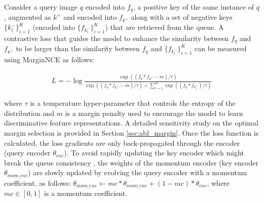 \documentclass[10pt,twocolumn,letterpaper]{ieeeconf}
\begin{document}
Consider a query image $q$ encoded into $f_q$, a positive key of the same instance of $q$, augmented as $k^+$ and encoded into $f_{k^+}$ along with a set of negative keys $\{k^-_i\}^K_{i=1}$ (encoded into $\{f_{k^-_i}\}^K_{i=1}$) that are retrieved from the queue. A contrastive loss that guides the model to enhance the similarity between $f_q$ and $f_{k^+}$ to be larger than the similarity between $f_q$ and $\{f_{k^-_i}\}^K_{i=1}$ can be measured using MarginNCE \cite{MarginNCE} as follows:
\begin{footnotesize}
\begin{align}
    L = - \log\frac{\exp\left((f_q*f_{k^+} - m) / \tau \right)} {\exp\left((f_q*f_{k^+} - m) / \tau \right) + \sum_{i=1}^{K}\exp\left((f_q*f_{k^-_i} ) / \tau\right)}
    \label{eq:MarginNCE}
\end{align}
\end{footnotesize}
where $\tau$ is a temperature hyper-parameter that controls the entropy of the distribution \cite{KD_temperature} and $m$ is a margin penalty used to encourage the model to learn discriminative feature representations. A detailed sensitivity study on the optimal margin selection is provided in Section \ref{sec:abl_margin}.
Once the loss function is calculated, the loss gradients are only back-propagated through the encoder (query encoder $\theta_{enc}$). 
To avoid rapidly updating the key encoder which might break the queue consistency \cite{Moco}, the weights of the momentum encoder (key encoder $\theta_{mom\_enc}$) are slowly updated by evolving the query encoder \cite{Moco} with a momentum coefficient, as follows: $\theta_{mom\_enc} \leftarrow mc * \theta_{mom\_enc} + (1-mc)* \theta_{enc}$, where $mc \in [0,1]$ is a momentum coefficient. 
\end{document}
